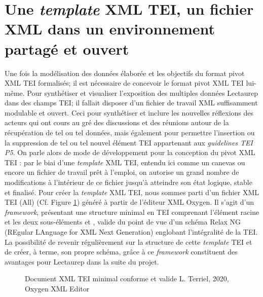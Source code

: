 \section{Une \textit{template} XML TEI, un fichier XML dans un environnement partagé et ouvert}
Une fois la modélisation des données élaborée et les objectifs du format pivot XML TEI formalisés; il est nécessaire de concevoir le format pivot XML TEI lui-même. 
Pour synthétiser et visualiser l'exposition des multiples données Lectaurep dans des champs TEI; il fallait disposer d'un fichier de travail XML suffisamment modulable et ouvert.
Ceci pour synthétiser et inclure les nouvelles réflexions des acteurs qui ont cours au gré des discussions et des réunions autour de la récupération de tel ou tel données, mais également pour permettre l'insertion ou la suppression de tel ou tel nouvel élément TEI appartenant aux \textit{guidelines TEI P5}.
On parle alors de mode de développement pour la conception du pivot XML TEI : par le biai d'une \textit{template} XML TEI, entendu ici comme un canevas ou encore un fichier de travail prêt à l'emploi, on autorise un grand nombre de modifications à l'intérieur de ce fichier jusqu'à atteindre son état logique, stable et finalisé. 
Pour créer la \textit{template} XML TEI, nous sommes parti d'un fichier XML TEI (All) (Cf. Figure \ref{fig:document_minimal_tei}) généré à partir de l'éditeur XML Oxygen. Il s'agit d'un \textit{framework}, présentant une structure minimal en TEI comprenant l'élément racine  et les deux sous-éléments  et , valide du point de vue d'un schéma Relax NG (REgular LAnguage for XML Next Generation) englobant l'intégralité de la TEI.
La possibilité de revenir régulièrement sur la structure de cette \textit{template} TEI et de créer, à terme, son propre schéma, grâce à ce \textit{framework} constituent des avantages pour Lectaurep dans la suite du projet.    
\begin{figure}[h]
    \centering
    \centerline{}
    \caption{Document XML TEI minimal conforme et valide  \textcopyright L. Terriel, 2020, Oxygen XML Editor}
    \label{fig:document_minimal_tei}
\end{figure}


